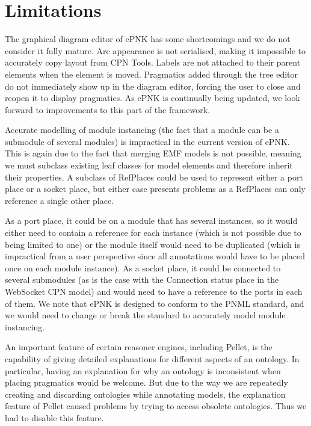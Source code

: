 \section{Limitations}\label{sec:limitations}

The graphical diagram editor of ePNK has some shortcomings and we do not
consider it fully mature. Arc appearance is not serialised, making it impossible
to accurately copy layout from CPN Tools. Labels are not attached to their
parent elements when the element is moved. Pragmatics added through the tree
editor do not immediately show up in the diagram editor, forcing the user to
close and reopen it to display pragmatics. As ePNK is continually being updated,
we look forward to improvements to this part of the framework.

Accurate modelling of module instancing (the fact that a module can be a
submodule of several modules) is impractical in the current version of ePNK.
This is again due to the fact that merging EMF models is not possible, meaning
we must subclass existing leaf classes for model elements and therefore inherit
their properties. A subclass of RefPlaces could be used to represent either a
port place or a socket place, but either case presents problems as a RefPlaces
can only reference a single other place. 

As a port place, it could be on a module that has several instances, so it would
either need to contain a reference for each instance (which is not possible due
to being limited to one) or the module itself would need to be duplicated
(which is impractical from a user perspective since all annotations would have to be
placed once on each module instance). As a socket place, it could be connected
to several submodules (as is the case with the Connection status place in the
WebSocket CPN model) and would need to have a reference to the ports in each of
them. We note that ePNK is designed to conform to the PNML standard, and we
would need to change or break the standard to accurately model module
instancing.

An important feature of certain reasoner engines, including Pellet, is the
capability of giving detailed explanations for  different aspects of an
ontology. In particular, having an explanation for why an ontology is
inconsistent when placing pragmatics would be welcome. But due to the way we are
repeatedly creating and discarding ontologies while annotating models, the
explanation feature of Pellet caused problems by trying to access obsolete
ontologies. Thus we had to disable this feature.
